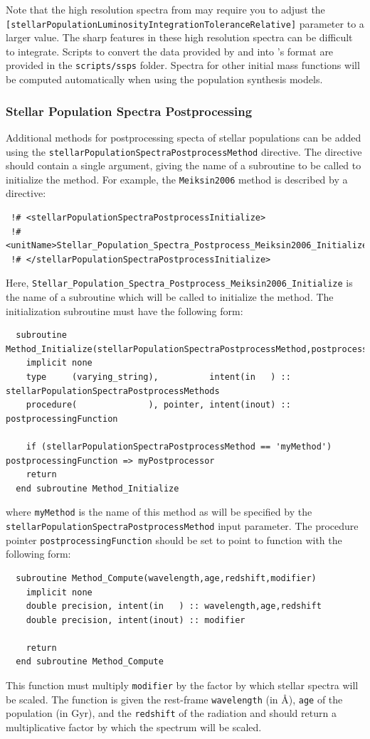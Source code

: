 Note that the high resolution spectra from \cite{bruzual_stellar_2003} may require you to adjust the {\tt [stellarPopulationLuminosityIntegrationToleranceRelative]} parameter to a larger value. The sharp features in these high resolution spectra can be difficult to integrate. Scripts to convert the data provided by \cite{maraston_evolutionary_2005} and \cite{bruzual_stellar_2003} into \glc's format are provided in the {\tt scripts/ssps} folder. Spectra for other initial mass functions will be computed automatically when using the \cite{conroy_propagation_2009} population synthesis models.

\subsubsection{Stellar Population Spectra Postprocessing}

Additional methods for postprocessing specta of stellar populations can be added using the {\tt stellarPopulationSpectraPostprocessMethod} directive. The directive should contain a single argument, giving the name of a subroutine to be called to initialize the method. For example, the {\tt Meiksin2006} method is described by a directive:
\begin{verbatim}
 !# <stellarPopulationSpectraPostprocessInitialize>
 !#  <unitName>Stellar_Population_Spectra_Postprocess_Meiksin2006_Initialize</unitName>
 !# </stellarPopulationSpectraPostprocessInitialize>
\end{verbatim}
Here, {\tt Stellar\_Population\_Spectra\_Postprocess\_Meiksin2006\_Initialize} is the name of a subroutine which will be called to initialize the method. The initialization subroutine must have the following form:
\begin{verbatim}
  subroutine Method_Initialize(stellarPopulationSpectraPostprocessMethod,postprocessingFunction)
    implicit none
    type     (varying_string),          intent(in   ) :: stellarPopulationSpectraPostprocessMethods
    procedure(              ), pointer, intent(inout) :: postprocessingFunction

    if (stellarPopulationSpectraPostprocessMethod == 'myMethod') postprocessingFunction => myPostprocessor
    return
  end subroutine Method_Initialize
\end{verbatim}
where {\tt myMethod} is the name of this method as will be specified by the {\tt stellarPopulationSpectraPostprocessMethod} input parameter. The procedure pointer {\tt postprocessingFunction} should be set to point to function with the following form:
\begin{verbatim}
  subroutine Method_Compute(wavelength,age,redshift,modifier)
    implicit none
    double precision, intent(in   ) :: wavelength,age,redshift
    double precision, intent(inout) :: modifier

    return
  end subroutine Method_Compute
\end{verbatim}
This function must multiply {\tt modifier} by the factor by which stellar spectra will be scaled. The function is given the rest-frame {\tt wavelength} (in \AA), {\tt age} of the population (in Gyr), and the {\tt redshift} of the radiation and should return a multiplicative factor by which the spectrum will be scaled.

